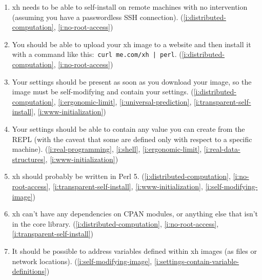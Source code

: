 \documentclass{report}
\begin{document}
\begin{enumerate}
\item{}\label{i:transparent-self-install}
  xh needs to be able to self-install on remote machines with no
  intervention (assuming you have a passwordless SSH connection).
    (\ref{i:distributed-computation},
     \ref{i:no-root-access})
\item{}\label{i:www-initialization}
  You should be able to upload your xh image to a website and then install
  it with a command like this:~\verb+curl me.com/xh | perl+.
    (\ref{i:distributed-computation},
     \ref{i:no-root-access})
\item{}\label{i:self-modifying-image}
  Your settings should be present as soon as you download your image, so
  the image must be self-modifying and contain your settings.
    (\ref{i:distributed-computation},
     \ref{i:ergonomic-limit},
     \ref{i:universal-prediction},
     \ref{i:transparent-self-install},
     \ref{i:www-initialization})
\item{}\label{i:settings-contain-variable-definitions}
  Your settings should be able to contain any value you can create from the
  REPL (with the caveat that some are defined only with respect to a
  specific machine).
    (\ref{i:real-programming},
     \ref{i:shell},
     \ref{i:ergonomic-limit},
     \ref{i:real-data-structures},
     \ref{i:www-initialization})
\item{}\label{i:written-in-perl}
  xh should probably be written in Perl 5.
    (\ref{i:distributed-computation},
     \ref{i:no-root-access},
     \ref{i:transparent-self-install},
     \ref{i:www-initialization},
     \ref{i:self-modifying-image})
\item{}\label{i:no-perl-modules}
  xh can't have any dependencies on CPAN modules, or anything else that
  isn't in the core library.
    (\ref{i:distributed-computation},
     \ref{i:no-root-access},
     \ref{i:transparent-self-install})
\item{}\label{i:image-merging}
  It should be possible to address variables defined within xh images (as
  files or network locations).
    (\ref{i:self-modifying-image},
     \ref{i:settings-contain-variable-definitions})


\end{enumerate}
\end{document}
